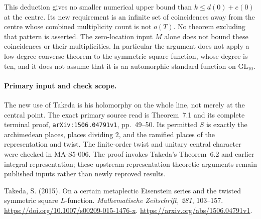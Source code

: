 This deduction gives no smaller numerical upper bound than
$k\le d(0)+e(0)$ at the centre. Its new requirement is an
infinite set of coincidences away from the centre whose
combined multiplicity count is not $o(T)$. No theorem excluding that
pattern is asserted. The zero-location input $M$ alone
does not bound these coincidences or their multiplicities.
In particular the argument does not apply a low-degree
converse theorem to the symmetric-square function, whose
degree is ten, and it does not assume that it is an
automorphic standard function on $\mathrm{GL}_{10}$.

\paragraph{Primary input and check scope.}
The new use of Takeda is his holomorphy on the whole line,
not merely at the central point. The exact primary source
read is Theorem~7.1 and its complete terminal proof,
\texttt{arXiv:1506.04791v1}, pp.~49--50. Its permitted $S$
is exactly the archimedean places, places dividing $2$,
and the ramified places of the representation and twist.
The finite-order twist and unitary central character
were checked in MA-S5-006. The proof invokes Takeda's
Theorem~6.2 and earlier integral representation; these
upstream representation-theoretic arguments remain
published inputs rather than newly reproved results.

Takeda, S. (2015). On a certain metaplectic Eisenstein
series and the twisted symmetric square $L$-function.
\emph{Mathematische Zeitschrift, 281}, 103--157.
\url{https://doi.org/10.1007/s00209-015-1476-x}.
\url{https://arxiv.org/abs/1506.04791v1}.
